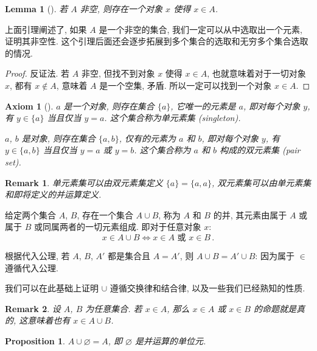 \documentclass[UTF8]{ctexart}
\theoremstyle{mystyle}
\newtheorem{axiom}{Axiom}[section]
\newtheorem{lemma}{Lemma}[section]
\newtheorem{proposition}{Proposition}[section]
\theoremstyle{myremark}
\newtheorem*{remark}{Remark}
\theoremstyle{plain}
\begin{document}
\begin{lemma}[]
    若 $ A $ 非空, 则存在一个对象 $ x $ 使得 $ x \in A $.
\end{lemma}

上面引理阐述了, 如果 $ A $ 是一个非空的集合, 我们一定可以从中选取出一个元素, 证明其非空性. 这个引理后面还会逐步拓展到多个集合的选取和无穷多个集合选取的情况.

\begin{proof}
    反证法. 若 $ A $ 非空, 但找不到对象 $ x $ 使得 $ x \in A $, 也就意味着对于一切对象 $ x $, 都有 $ x \notin A $, 意味着 $ A $ 是一个空集, 矛盾. 所以一定可以找到一个对象 $ x \in A $.
\end{proof}

\begin{axiom}[]
    $ a $ 是一个对象, 则存在集合 $ \{a\} $, 它唯一的元素是 $ a $, 即对每个对象 $ y $, 有 $ y \in \{a\} $ 当且仅当 $ y = a $. 这个集合称为单元素集 (singleton).

    $ a $, $ b $ 是对象, 则存在集合 $ \{a, b\} $, 仅有的元素为 $ a $ 和 $ b $, 即对每个对象 $ y $, 有 $ y \in \{a, b\} $ 当且仅当 $ y = a $ 或 $ y = b $. 这个集合称为 $ a $ 和 $ b $ 构成的双元素集 (pair set).
\end{axiom}

\begin{remark}
    单元素集可以由双元素集定义 $ \{a\} = \{a, a\} $, 双元素集可以由单元素集和即将定义的并运算定义.
\end{remark}

\begin{definition}
    给定两个集合 $ A $, $ B $, 存在一个集合 $ A \cup B $, 称为 $ A $ 和 $ B $ 的并, 其元素由属于 $ A $ 或属于 $ B $ 或同属两者的一切元素组成. 即对于任意对象 $ x $: \[ x \in A \cup B \Longleftrightarrow x \in A \text{ 或 } x \in B \,.\]
\end{definition}

根据代入公理, 若 $ A $, $ B $, $ A' $ 都是集合且 $ A = A' $, 则 $ A \cup B = A' \cup B $: 因为属于 $ \in $ 遵循代入公理. 

我们可以在此基础上证明 $ \cup $ 遵循交换律和结合律, 以及一些我们已经熟知的性质. 

\begin{remark}
    设 $ A $, $ B $ 为任意集合. 若 $ x \in A $, 那么 $ x \in A $ 或 $ x \in B $ 的命题就是真的, 这意味着也有 $ x \in A \cup B $.
\end{remark}

\begin{proposition}
    $ A \cup \varnothing = A $, 即 $ \varnothing $ 是并运算的单位元.
\end{proposition}
\end{document}
